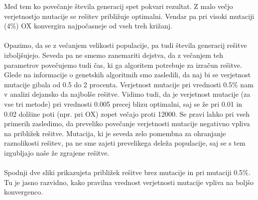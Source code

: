 \documentclass[12pt,a4paper]{amsart}
\theoremstyle{definition} %
\theoremstyle{plain} %
\begin{document}
Med tem ko povečanje števila generacij spet pokvari rezultat. Z malo večjo verjetnostjo mutacije se rešitev približuje optimalni. Vendar pa pri visoki mutaciji (4\%) OX konvergira najpočasneje od vseh treh križanj. 
\\
\\
Opazimo, da se z večanjem velikosti populacije, pa tudi števila generacij rešitve izboljšujejo. Seveda pa ne smemo zanemariti dejstva, da z večanjem teh parametrov povečujemo tudi čas, ki ga algoritem potrebuje za izračun rešitve.  Glede na informacije o genetskih algoritmih smo zasledili, da naj bi se verjetnost mutacije gibala od 0.5 do 2 procenta. Verjetnost mutacije pri vrednosti 0.5\% nam v analizi dejansko da najbolše rešitve. Vidimo tudi, da je verjetnost mutacije (za vse tri metode) pri vrednosti 0.005 precej blizu optimalni, saj se že pri 0.01 in 0.02 dolžine poti (npr. pri OX) zopet večajo proti 12000. Se pravi lahko pri vseh primerih zasledimo, da preveliko povečanje verjetnosti mutacije negativno vpliva na približek rešitve. Mutacija, ki je seveda zelo pomembna za ohranjanje raznolikosti rešitev, pa ne sme zajeti prevelikega deleža populacije, saj se s tem izgubljajo naše že zgrajene rešitve. 
\\
\\
Spodnji dve sliki prikazujeta približek rešitve brez mutacije in pri mutaciji 0.5\%. Tu je jasno razvidno, kako pravilna vrednost verjetnosti mutacije vpliva na boljšo konvergenco. 
\\
\\
\end{document}
